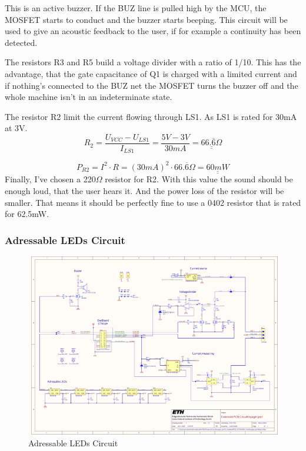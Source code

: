 This is an active buzzer. If the BUZ line is pulled high by the MCU, the MOSFET starts to conduct and the buzzer starts beeping. This circuit will be used to give an acoustic feedback to the user, if for example a continuity has been detected. 

The resistors R3 and R5 build a voltage divider with a ratio of 1/10. This has the advantage, that the gate capacitance of Q1 is charged with a limited current and if nothing's connected to the BUZ net the MOSFET turns the buzzer off and the whole machine isn't  in an indeterminate state.

The resistor R2 limit the current flowing through LS1. As LS1 is rated for 30mA at 3V.
\[R_2=\frac{U_{VCC}-U_{LS1}}{I_{LS1}}=\frac{5V-3V}{30mA}= \underline{\underline{66.\overline{6}\Omega}}\]

\[P_{R2}=I^2 \cdot R=(30mA)^2 \cdot 66. \overline{6} \Omega = \underline{\underline{60mW}}\]
Finally, I've chosen a 220\(\Omega\) resistor for R2. With this value the sound should be enough loud, that the user hears it. And the power loss of the resistor will be smaller. That means it should be perfectly fine to use a 0402 resistor that is rated for 62.5mW.


\subsubsection{Adressable LEDs Circuit}

\begin{figure}[H]
	\centering
	\includegraphics[width=15cm, trim={1.3cm 4cm 16.3cm 20cm}, clip]{../../../5_Hardware/PCB_EXTENSION_CircuitVoyager_pre1/Project Outputs for PCB_EXT_CV_PRE1/Schematic_PCB_EXTENSION_CircuitVoyager_pre1.pdf}
	\caption{Adressable LEDs Circuit}
	\label{fig:Adressable LEDs Circuit}
\end{figure}

